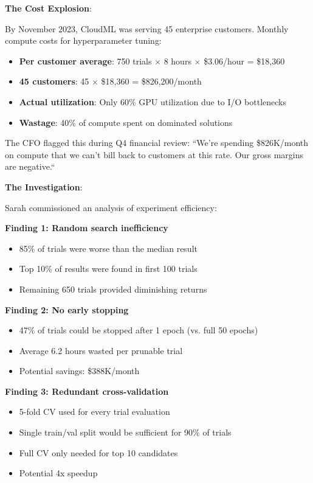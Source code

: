 \textbf{The Cost Explosion}:

By November 2023, CloudML was serving 45 enterprise customers. Monthly compute costs for hyperparameter tuning:

\begin{itemize}
    \item \textbf{Per customer average}: 750 trials $\times$ 8 hours $\times$ \$3.06/hour = \$18,360
    \item \textbf{45 customers}: 45 $\times$ \$18,360 = \$826,200/month
    \item \textbf{Actual utilization}: Only 60\% GPU utilization due to I/O bottlenecks
    \item \textbf{Wastage}: 40\% of compute spent on dominated solutions
\end{itemize}

The CFO flagged this during Q4 financial review: ``We're spending \$826K/month on compute that we can't bill back to customers at this rate. Our gross margins are negative.``

\textbf{The Investigation}:

Sarah commissioned an analysis of experiment efficiency:

\textbf{Finding 1: Random search inefficiency}
\begin{itemize}
    \item 85\% of trials were worse than the median result
    \item Top 10\% of results were found in first 100 trials
    \item Remaining 650 trials provided diminishing returns
\end{itemize}

\textbf{Finding 2: No early stopping}
\begin{itemize}
    \item 47\% of trials could be stopped after 1 epoch (vs. full 50 epochs)
    \item Average 6.2 hours wasted per prunable trial
    \item Potential savings: \$388K/month
\end{itemize}

\textbf{Finding 3: Redundant cross-validation}
\begin{itemize}
    \item 5-fold CV used for every trial evaluation
    \item Single train/val split would be sufficient for 90\% of trials
    \item Full CV only needed for top 10 candidates
    \item Potential 4x speedup
\end{itemize}

